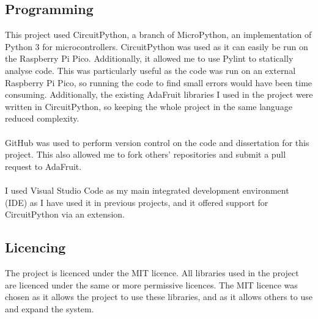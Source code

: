 \documentclass[12pt,a4paper]{report}
\begin{document}
\subsection{Programming}  
This project used CircuitPython, a branch of MicroPython, an implementation of Python 3 for microcontrollers. CircuitPython was used as it can easily be run on the Raspberry Pi Pico. Additionally, it allowed me to use Pylint to statically analyse code. This was particularly useful as the code was run on an external Raspberry Pi Pico, so running the code to find small errors would have been time consuming. Additionally, the existing AdaFruit libraries I used in the project were written in CircuitPython, so keeping the whole project in the same language reduced complexity. \\ \\
GitHub was used to perform version control on the code and dissertation for this project. This also allowed me to fork others' repositories and submit a pull request to AdaFruit. \\ \\ 
I used Visual Studio Code as my main integrated development environment (IDE) as I have used it in previous projects, and it offered support for CircuitPython via an extension. \\

\subsection{Licencing}
The project is licenced under the MIT licence. All libraries used in the project are licenced under the same or more permissive licences. The MIT licence was chosen as it allows the project to use these libraries, and as it allows others to use and expand the system. \\
\end{document}
